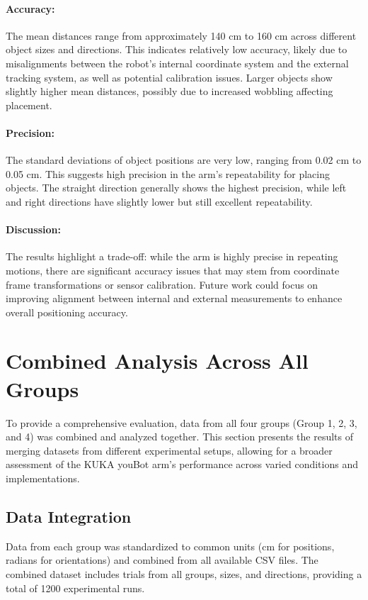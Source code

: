 \documentclass{article}
\begin{document}
\paragraph{Accuracy:}
The mean distances range from approximately 140 cm to 160 cm across different object sizes and directions. This indicates relatively low accuracy, likely due to misalignments between the robot's internal coordinate system and the external tracking system, as well as potential calibration issues. Larger objects show slightly higher mean distances, possibly due to increased wobbling affecting placement.

\paragraph{Precision:}
The standard deviations of object positions are very low, ranging from 0.02 cm to 0.05 cm. This suggests high precision in the arm's repeatability for placing objects. The straight direction generally shows the highest precision, while left and right directions have slightly lower but still excellent repeatability.

\paragraph{Discussion:}
The results highlight a trade-off: while the arm is highly precise in repeating motions, there are significant accuracy issues that may stem from coordinate frame transformations or sensor calibration. Future work could focus on improving alignment between internal and external measurements to enhance overall positioning accuracy.

\newpage

\section{Combined Analysis Across All Groups}
To provide a comprehensive evaluation, data from all four groups (Group 1, 2, 3, and 4) was combined and analyzed together. This section presents the results of merging datasets from different experimental setups, allowing for a broader assessment of the KUKA youBot arm's performance across varied conditions and implementations.

\subsection{Data Integration}
Data from each group was standardized to common units (cm for positions, radians for orientations) and combined from all available CSV files. The combined dataset includes trials from all groups, sizes, and directions, providing a total of 1200 experimental runs.
\end{document}
